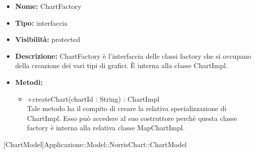 			
			\begin{itemize}
			\item \textbf{Nome:} ChartFactory
			\item \textbf{Tipo:} interfaccia
			
			\item \textbf{Visibilità:} protected
			\item \textbf{Descrizione:} ChartFactory è l'interfaccia delle classi factory che si occupano della creazione dei vari tipi di grafici. È interna alla classe ChartImpl.
			\item \textbf{Metodi:}
				\begin{itemize}
				\setlength{\itemsep}{5pt}
				
					\item[\ding{111}] {{+createChart(chartId : String) : ChartImpl}} \\ [1mm] Tale metodo ha il compito di creare la relativa specializzazione di ChartImpl. Esso può accedere al suo costruttore perchè questa classe factory è interna alla relativa classe MapChartImpl.
				\end{itemize}
		
			\end{itemize}

			
			[ChartModel]{Applicazione::Model::NorrisChart::ChartModel}
			

	
